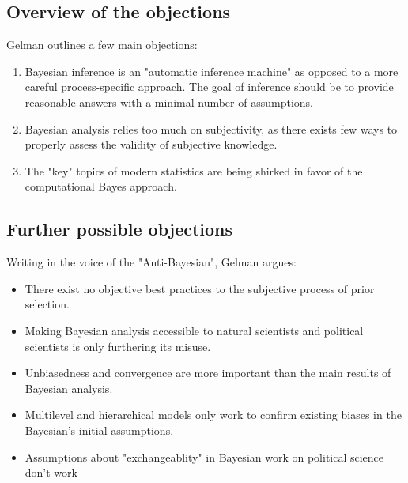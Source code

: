 \documentclass{article}
\begin{document}
\subsection{Overview of the objections}
Gelman outlines a few main objections:
\begin{enumerate}
\item Bayesian inference is an "automatic inference machine" as opposed to a more careful process-specific approach. The goal of inference should be to provide reasonable answers with a minimal number of assumptions. 
\item Bayesian analysis relies too much on subjectivity, as there exists few ways to properly assess the validity of subjective knowledge.
\item The "key" topics of modern statistics are being shirked in favor of the computational Bayes approach.
\end{enumerate}
\subsection{Further possible objections}
Writing in the voice of the "Anti-Bayesian", Gelman argues:
\begin{itemize}
\item There exist no objective best practices to the subjective process of prior selection.
\item Making Bayesian analysis accessible to natural scientists and political scientists is only furthering its misuse.
\item Unbiasedness and convergence are more important than the main results of Bayesian analysis.
\item Multilevel and hierarchical models only work to confirm existing biases in the Bayesian's initial assumptions.
\item Assumptions about "exchangeablity" in Bayesian work on political science don't work 
\end{itemize}
\end{document}
